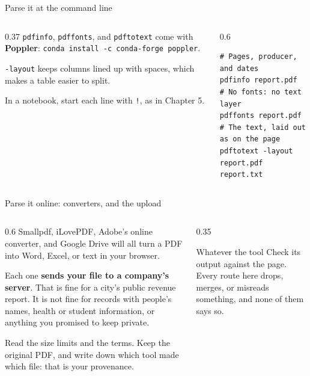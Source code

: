 \documentclass[9pt,aspectratio=169]{beamer}
\begin{document}
\begin{frame}[fragile]{Parse it at the command line}
    \begin{columns}[T]
        \begin{column}{0.37\textwidth}
            \texttt{pdfinfo}, \texttt{pdffonts}, and \texttt{pdftotext} come with \textbf{Poppler}: \texttt{conda install -c conda-forge poppler}.

            \medskip
            \texttt{-layout} keeps columns lined up with spaces, which makes a table easier to split.

            \medskip
            In a notebook, start each line with \texttt{!}, as in Chapter 5.
        \end{column}
        \begin{column}{0.6\textwidth}
\begin{lstlisting}
# Pages, producer, and dates
pdfinfo report.pdf
# No fonts: no text layer
pdffonts report.pdf
# The text, laid out as on the page
pdftotext -layout report.pdf report.txt
\end{lstlisting}
        \end{column}
    \end{columns}
\end{frame}

\begin{frame}{Parse it online: converters, and the upload}
    \begin{columns}[T]
        \begin{column}{0.6\textwidth}
            Smallpdf, iLovePDF, Adobe's online converter, and Google Drive will all turn a PDF into Word, Excel, or text in your browser.

            \medskip

            Each one \textbf{sends your file to a company's server}. That is fine for a city's public revenue report. It is not fine for records with people's names, health or student information, or anything you promised to keep private.

            \medskip

            Read the size limits and the terms. Keep the original PDF, and write down which tool made which file: that is your provenance.
        \end{column}
        \begin{column}{0.35\textwidth}
            \begin{alertblock}{Whatever the tool}
                \small Check its output against the page. Every route here drops, merges, or misreads something, and none of them says so.
            \end{alertblock}
        \end{column}
    \end{columns}
\end{frame}
\end{document}
